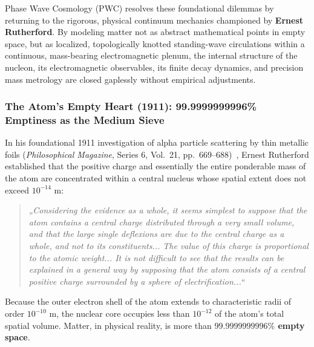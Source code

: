 \documentclass[11pt,a4paper]{article}
\begin{document}
Phase Wave Cosmology (PWC) resolves these foundational dilemmas by returning to the rigorous, physical continuum mechanics championed by \textbf{Ernest Rutherford}. By modeling matter not as abstract mathematical points in empty space, but as localized, topologically knotted standing-wave circulations within a continuous, mass-bearing electromagnetic plenum, the internal structure of the nucleon, its electromagnetic observables, its finite decay dynamics, and precision mass metrology are closed gaplessly without empirical adjustments.

\subsubsection{The Atom's Empty Heart (1911): 99.9999999996\% Emptiness as the Medium Sieve}
\label{subsubsec:rutherford_1911_empty}

In his foundational 1911 investigation of alpha particle scattering by thin metallic foils (\textit{Philosophical Magazine}, Series 6, Vol.~21, pp.~669--688)~\cite{Rutherford1911}, Ernest Rutherford established that the positive charge and essentially the entire ponderable mass of the atom are concentrated within a central nucleus whose spatial extent does not exceed $10^{-14}\text{ m}$:
\begin{quote}
\textit{„Considering the evidence as a whole, it seems simplest to suppose that the atom contains a central charge distributed through a very small volume, and that the large single deflexions are due to the central charge as a whole, and not to its constituents... The value of this charge is proportional to the atomic weight... It is not difficult to see that the results can be explained in a general way by supposing that the atom consists of a central positive charge surrounded by a sphere of electrification...“}
\end{quote}
Because the outer electron shell of the atom extends to characteristic radii of order $10^{-10}\text{ m}$, the nuclear core occupies less than $10^{-12}$ of the atom's total spatial volume. Matter, in physical reality, is more than \textbf{$99.9999999996\%$ empty space}.
\end{document}
